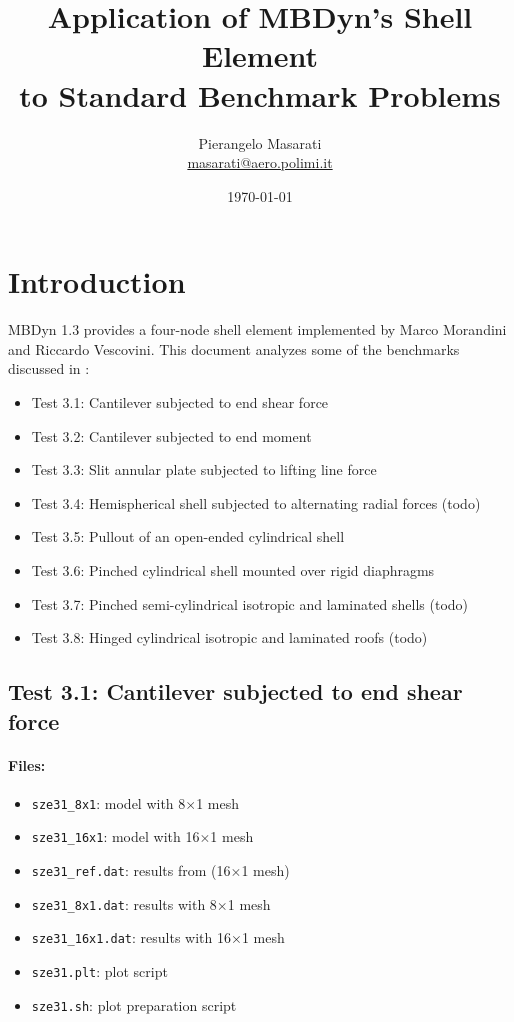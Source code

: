 \documentclass{article}
\newcommand{\mesh}[2]{#1$\times$#2}
\begin{document}
\title{Application of MBDyn's Shell Element \\ to Standard Benchmark Problems}
\author{Pierangelo Masarati \\ \url{masarati@aero.polimi.it}}
\date{\today}
\maketitle

\section{Introduction}
MBDyn 1.3 provides a four-node shell element
implemented by Marco Morandini and Riccardo Vescovini.
This document analyzes some of the benchmarks
discussed in \cite{SZE-2004}:

\begin{itemize}
\item Test 3.1: Cantilever subjected to end shear force
\item Test 3.2: Cantilever subjected to end moment
\item Test 3.3: Slit annular plate subjected to lifting line force
\item Test 3.4: Hemispherical shell subjected to alternating radial forces (todo)
\item Test 3.5: Pullout of an open-ended cylindrical shell
\item Test 3.6: Pinched cylindrical shell mounted over rigid diaphragms
\item Test 3.7: Pinched semi-cylindrical isotropic and laminated shells (todo)
\item Test 3.8: Hinged cylindrical isotropic and laminated roofs (todo)
\end{itemize}



\subsection{Test 3.1: Cantilever subjected to end shear force}
\paragraph{Files:}
\begin{itemize}
\item \verb!sze31_8x1!: model with \mesh{8}{1} mesh
\item \verb!sze31_16x1!: model with \mesh{16}{1} mesh
\item \verb!sze31_ref.dat!: results from \cite{SZE-2004} (\mesh{16}{1} mesh)
\item \verb!sze31_8x1.dat!: results with \mesh{8}{1} mesh
\item \verb!sze31_16x1.dat!: results with \mesh{16}{1} mesh
\item \verb!sze31.plt!: plot script
\item \verb!sze31.sh!: plot preparation script
\end{itemize}
\end{document}
